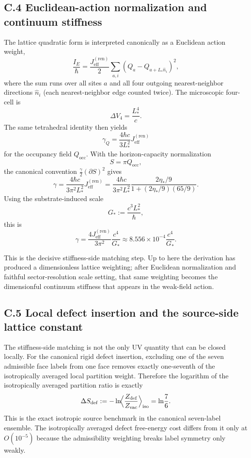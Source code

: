 \documentclass[11pt]{article}
\begin{document}
\subsection*{C.4 Euclidean-action normalization and continuum stiffness}

The lattice quadratic form is interpreted canonically as a Euclidean action weight,
\[
\frac{I_E}{\hbar}
=
\frac{J_{\mathrm{eff}}^{(\mathrm{ren})}}{2}
\sum_{a,i}(Q_a-Q_{a+L_*\hat n_i})^2,
\]
where the sum runs over all sites $a$ and all four outgoing nearest-neighbor directions $\hat n_i$ (each nearest-neighbor edge counted twice). The microscopic four-cell is
\[
\Delta V_4=\frac{L_*^4}{c}.
\]
The same tetrahedral identity then yields
\[
\gamma_Q=\frac{4\hbar c}{3L_*^2}J_{\mathrm{eff}}^{(\mathrm{ren})}
\]
for the occupancy field $Q_{\mathrm{occ}}$. With the horizon-capacity normalization
\[
S=\pi Q_{\mathrm{occ}},
\]
the canonical convention $\frac{\gamma}{2}(\partial S)^2$ gives
\[
\gamma
=
\frac{4\hbar c}{3\pi^2L_*^2}J_{\mathrm{eff}}^{(\mathrm{ren})}
=
\frac{4\hbar c}{3\pi^2L_*^2}
\frac{2\eta_*/9}{1+(2\eta_*/9)(65/9)}.
\]
Using the substrate-induced scale
\[
G_*:=\frac{c^3L_*^2}{\hbar},
\]
this is
\[
\gamma
=
\frac{4J_{\mathrm{eff}}^{(\mathrm{ren})}}{3\pi^2}\frac{c^4}{G_*}
\approx
8.556\times10^{-4}\frac{c^4}{G_*}.
\]

This is the decisive stiffness-side matching step. Up to here the derivation has produced a dimensionless lattice weighting; after Euclidean normalization and faithful sector-resolution scale setting, that same weighting becomes the dimensionful continuum stiffness that appears in the weak-field action.

\subsection*{C.5 Local defect insertion and the source-side lattice constant}

The stiffness-side matching is not the only UV quantity that can be closed locally. For the canonical rigid defect insertion, excluding one of the seven admissible face labels from one face removes exactly one-seventh of the isotropically averaged local partition weight. Therefore the logarithm of the isotropically averaged partition ratio is exactly
\[
\Delta S_{\mathrm{def}}
:=
-\ln\!\Bigl\langle \frac{Z_{\mathrm{def}}}{Z_{\mathrm{vac}}}\Bigr\rangle_{\mathrm{iso}}
=
\ln\!\frac{7}{6}.
\]
This is the exact isotropic source benchmark in the canonical seven-label ensemble. The isotropically averaged defect free-energy cost differs from it only at $O(10^{-5})$ because the admissibility weighting breaks label symmetry only weakly.
\end{document}
